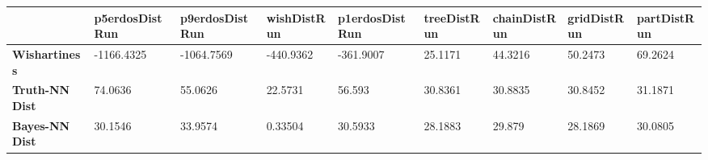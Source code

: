 \begin{tabular}{|l|l|l|l|l|l|l|l|l|}
\hline
&\textbf{p5erdosDistRun}&\textbf{p9erdosDistRun}&\textbf{wishDistRun}&\textbf{p1erdosDistRun}&\textbf{treeDistRun}&\textbf{chainDistRun}&\textbf{gridDistRun}&\textbf{partDistRun}\\\hline
\textbf{Wishartiness}&-1166.4325&-1064.7569&-440.9362&-361.9007&25.1171&44.3216&50.2473&69.2624\\\hline
\textbf{Truth-NN Dist}&74.0636&55.0626&22.5731&56.593&30.8361&30.8835&30.8452&31.1871\\\hline
\textbf{Bayes-NN Dist}&30.1546&33.9574&0.33504&30.5933&28.1883&29.879&28.1869&30.0805\\\hline
\end{tabular}
